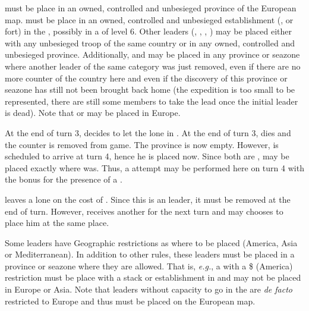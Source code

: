 \bparag \LeaderMis must be place in an owned, controlled and unbesieged
province of the European map.
\bparag \LeaderGov must be place in an owned, controlled and unbesieged
establishment (\COL, \TP or fort) in the \ROTW, possibly in a \COL of level 6.
\bparag Other leaders (\LeaderG, \LeaderA, \LeaderE, \LeaderC) may be placed
either with any unbesieged troop of the same country or in any owned,
controlled and unbesieged province.
\bparag Additionally, \LeaderE and \LeaderC may be placed in any province or
seazone where another leader of the same category was just removed, even if
there are no more counter of the country here and even if the discovery of
this province or seazone has still not been brought back home (the expedition
is too small to be represented, there are still some members to take the lead
once the initial leader is dead).
\bparag Note that \LeaderE or \LeaderC may be placed in Europe.

\begin{exemple}
  At the end of turn 3, \HIS decides to let the lone  in
  \granderegionCuba. At the end of turn 3, \leaderColon dies and the counter
  is removed from game. The province is now empty. However,
   is scheduled to arrive at turn 4, hence he is placed
  now. Since both are \LeaderE, \leaderSolis may be placed exactly where
  \leaderColon was. Thus, a \COL attempt may be performed here on turn 4 with
  the bonus for the presence of a \LeaderE.

  \smallskip

  \ANG leaves a lone \anonyme\LeaderC on the cost of \continentAmerica. Since
  this is an \anonyme leader, it must be removed at the end of turn. However,
  \ANG receives another \anonyme \LeaderC for the next turn and may chooses to
  place him at the same place.
\end{exemple}

 Some leaders have Geographic restrictions as
where to be placed (America, Asia or Mediterranean).
\bparag In addition to other rules, these leaders must be placed in a province
or seazone where they are allowed.
\bparag That is, \emph{e.g.}, a \LeaderG with a \$ (America) restriction must
be place with a stack or establishment in \continentAmerica and may not be
placed in Europe or Asia.
\bparag Note that leaders without capacity to go in the \ROTW are \emph{de
  facto} restricted to Europe and thus must be placed on the European map.

